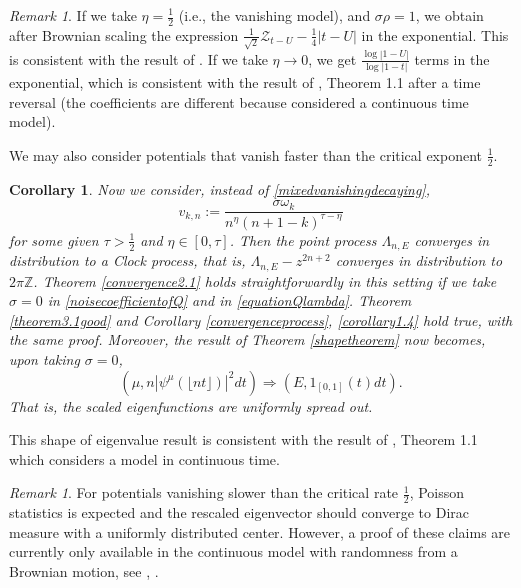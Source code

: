 \documentclass[12pt, reqno]{amsart}
\newtheorem{corollary}[theorem]{Corollary}
\theoremstyle{definition}
\theoremstyle{remark}
\newtheorem{remark}[theorem]{Remark}
\numberwithin{equation}{section}
\begin{document}
\begin{remark} If we take $\eta=\frac{1}{2}$ (i.e., the vanishing model), and $\sigma\rho=1$, we obtain after Brownian scaling the expression $\frac{1}{\sqrt{2}}\mathcal{Z}_{t-U}-\frac{1}{4}|t-U|$ in the exponential. This is consistent with the result of \cite{rifkind2018eigenvectors}. If we take $\eta\to 0$, we get $\frac{\log|1-U|}{\log|1-t|}$ terms in the exponential, which is consistent with the result of \cite{nakano2022shape}, Theorem 1.1 after a time reversal (the coefficients are different because \cite{nakano2022shape} considered a continuous time model).
\end{remark}

We may also consider potentials that vanish faster than the critical exponent $
    \frac{1}{2}$.
\begin{corollary}\label{reallyfast}
    Now we consider, instead of \eqref{mixedvanishingdecaying},
    \begin{equation}
        v_{k,n}:=\frac{\sigma\omega_k}{n^\eta (n+1-k)^{\tau-\eta}}
    \end{equation}
    for some given $\tau>\frac{1}{2}$ and $\eta\in[0,\tau]$. Then the point process $\Lambda_{n,E}$ converges in distribution to a Clock process, that is, $\Lambda_{n,E}-z^{2n+2}$ converges in distribution to $2\pi\mathbb{Z}$. Theorem \ref{convergence2.1} holds straightforwardly in this setting if we take $\sigma=0$ in \eqref{noisecoefficientofQ} and in \eqref{equationQlambda}. Theorem \ref{theorem3.1good} and Corollary \ref{convergenceprocess}, \ref{corollary1.4} hold true, with the same proof.  Moreover, the result of Theorem \ref{shapetheorem} now becomes, upon taking $\sigma=0$,  
    $$ \left(\mu,n|\psi^\mu(\lfloor nt\rfloor)|^2 dt\right)
    \Rightarrow (E,1_{[0,1]}(t)dt).$$ That is, the scaled eigenfunctions are uniformly spread out. 
\end{corollary}
This shape of eigenvalue result is consistent with the result of \cite{nakano2022shape}, Theorem 1.1 which considers a model in continuous time. 
    
\begin{remark}
    For potentials vanishing slower than the critical rate $\frac{1}{2}$, Poisson statistics is expected and the rescaled eigenvector should converge to Dirac measure with a uniformly distributed center. However, a proof of these claims are currently only available in the continuous model with randomness from a Brownian motion, see \cite{kotani2017poisson}, \cite{nakano2022shape}.
\end{remark}
\end{document}
